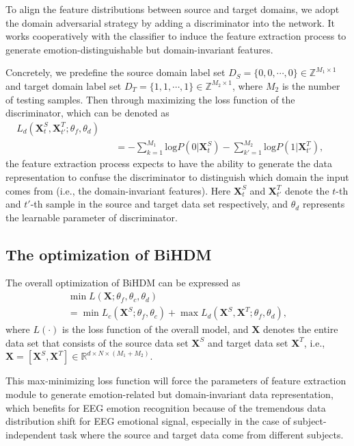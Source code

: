 \documentclass[journal]{IEEEtran}
\begin{document}
To align the feature distributions between source and target domains, we adopt the domain adversarial strategy by adding a discriminator into the network. It works cooperatively with the classifier to induce the feature extraction process to generate emotion-distinguishable but domain-invariant features.

Concretely, we predefine the source domain label set $D_S=\{0,0,\cdots,0\}\!\in\!\mathbb{Z}^{M_1\times 1}$ and target domain label set $D_T=\{1,1,\cdots,1\}\!\in\!\mathbb{Z}^{M_2\times 1}$, where $M_2$ is the number of testing samples. Then through maximizing the loss function of the discriminator, which can be denoted as
\begin{eqnarray}
\label{Eq: discriminator loss function}
L_d(\mathbf{X}^S_t,\mathbf{X}^T_{t'};\theta_f,\theta_d) \!\!\!\!\!\!\!\!\!\!\!\!\!\!\!\!\!\!\!\!\!\!\!\!\!\!\!\!\!\!\!\!\!\!\!\!\!\!\!\!\!\!\!\!\!\!\!\!&&\nonumber\\
&&= -\sum\nolimits_{k=1}^{M_1} \textrm{log} P(0|\mathbf{X}^S_t) - \sum\nolimits_{k'=1}^{M_2} \textrm{log} P(1|\mathbf{X}^T_{t'}),~~~~~~~
\end{eqnarray}
the feature extraction process expects to have the ability to generate the data representation to confuse the discriminator to distinguish which domain the input comes from (i.e., the domain-invariant features). Here $\mathbf{X}^S_t$ and $\mathbf{X}^T_{t'}$ denote the $t$-th and $t'$-th sample in the source and target data set respectively, and $\theta_d$ represents the learnable parameter of discriminator. 

\subsection{The optimization of BiHDM}
The overall optimization of BiHDM can be expressed as
\begin{eqnarray}
\label{Eq: overall loss function}
\min L(\mathbf{X};\theta_f,\theta_c,\theta_d) ~~~~~~~~~~~~~~~~~~~~~~~~~~~~~~~~~~~~~~~~~~\nonumber\\
= \min L_c(\mathbf{X}^S;\theta_f,\theta_c) + \max L_d(\mathbf{X}^S,\mathbf{X}^T;\theta_f,\theta_d),
\end{eqnarray}
where $L(\cdot)$ is the loss function of the overall model, and $\mathbf{X}$ denotes the entire data set that consists of the source data set $\mathbf{X}^S$ and target data set $\mathbf{X}^T$, i.e., $\mathbf{X}\!=\![\mathbf{X}^S,\mathbf{X}^T] \!\in\! \mathbb{R}^{d\times N \times (M_1\!+\!M_2)}$.

This max-minimizing loss function will force the parameters of feature extraction module to generate emotion-related but domain-invariant data representation, which benefits for EEG emotion recognition because of the tremendous data distribution shift for EEG emotional signal, especially in the case of subject-independent task where the source and target data come from different subjects.
\end{document}
